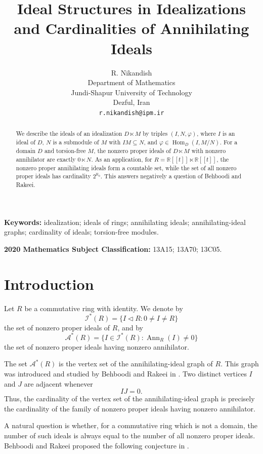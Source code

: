 \documentclass[11pt]{article}
\title{Ideal Structures in Idealizations and Cardinalities of Annihilating Ideals}
\author{R. Nikandish\\
	Department of Mathematics\\
	Jundi-Shapur University of Technology\\
	Dezful, Iran\\
	\texttt{r.nikandish@ipm.ir}}
\date{}
\theoremstyle{definition}
\theoremstyle{remark}
\begin{document}
	
	\maketitle
	
	\begin{abstract}
	We describe the ideals of an idealization $D\ltimes M$ by triples $(I,N,\varphi)$, where $I$ is an ideal of $D$, $N$ is a submodule of $M$ with $IM\subseteq N$, and $\varphi\in\operatorname{Hom}_D(I,M/N)$. For a domain $D$ and torsion-free $M$, the nonzero proper ideals of $D\ltimes M$ with nonzero annihilator are exactly $0\ltimes N$. As an application, for $R=\mathbb R[[t]]\ltimes\mathbb R[[t]]$, the nonzero proper annihilating ideals form a countable set, while the set of all nonzero proper ideals has cardinality $2^{\aleph_0}$. This answers negatively a question of Behboodi and Rakeei.
	\end{abstract}
	
	\noindent
	\textbf{Keywords:}
	idealization; ideals of rings; annihilating ideals; annihilating-ideal
	graphs; cardinality of ideals; torsion-free modules.
	
	\medskip
	
	\noindent
	\textbf{2020 Mathematics Subject Classification:}
	13A15; 13A70; 13C05.
	
\section{Introduction}

Let $R$ be a commutative ring with identity. We denote by
\[
\mathcal I^*(R)
=
\{I\lhd R:0\neq I\neq R\}
\]
the set of nonzero proper ideals of $R$, and by
\[
\mathcal A^*(R)
=
\{I\in\mathcal I^*(R):\operatorname{Ann}_R(I)\neq0\}
\]
the set of nonzero proper ideals having nonzero annihilator.

The set $\mathcal A^*(R)$ is the vertex set of the
annihilating-ideal graph of $R$. This graph was introduced and
studied by Behboodi and Rakeei in \cite{BehboodiRakeei}. Two distinct
vertices $I$ and $J$ are adjacent whenever
\[
IJ=0.
\]
Thus, the cardinality of the vertex set of the annihilating-ideal
graph is precisely the cardinality of the family of nonzero proper
ideals having nonzero annihilator.

A natural question is whether, for a commutative ring which is not a
domain, the number of such ideals is always equal to the number of
all nonzero proper ideals. Behboodi and Rakeei proposed the following
conjecture in \cite{BehboodiRakeei}.
\end{document}

